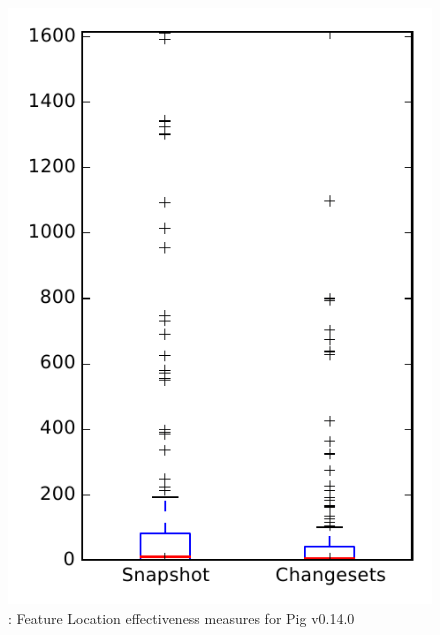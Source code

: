 
\begin{figure}
\centering
\includegraphics[height=0.4\textheight]{figures/flt/rq1_pig}
\caption{\fone: Feature Location effectiveness measures for Pig v0.14.0}
\label{fig:flt:rq1:pig}
\end{figure}
